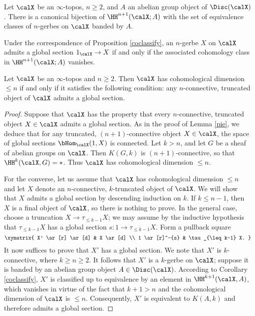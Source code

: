 \begin{corollary}\label{coclassify}
Let $\calX$ be an $\infty$-topos, $n \geq 2$, and $A$ an abelian group object
of $\Disc( \calX)$. There is a canonical bijection of
$\HH^{n+1}(\calX; A)$ with the set of equivalence classes of $n$-gerbes on $\calX$ banded by $A$.
\end{corollary}

\begin{remark}
Under the correspondence of Proposition \ref{coclassify}, an $n$-gerbe $X$ on $\calX$
admits a global section $1_{\calX} \rightarrow X$ if and only if the associated cohomology
class in $\HH^{n+1}(\calX;A)$ vanishes.
\end{remark}

\begin{theorem}\label{cohdim}
Let $\calX$ be an $\infty$-topos and $n \geq 2$. Then $\calX$ has
cohomological dimension $\leq n$ if and only if it satisfies the
following condition: any $n$-connective, truncated object of
$\calX$ admits a global section.
\end{theorem}

\begin{proof}
Suppose that $\calX$ has the property that every
$n$-connective, truncated object $X \in \calX$ admits a global
section. As in the proof of Lemma \ref{pie}, we deduce that for any
truncated, $(n+1)$-connective object $X \in \calX$, the space of global sections 
$\bHom_{\calX}(1,X)$ is connected.
Let $k > n$, and let $G$ be a sheaf of abelian groups on $\calX$. Then $K(G,k)$ is
$(n+1)$-connective, so that $\HH^k(\calX,G) = \ast$. Thus $\calX$ has
cohomological dimension $\leq n$.

For the converse, let us assume that $\calX$ has cohomological
dimension $\leq n$ and let $X$ denote an $n$-connective,
$k$-truncated object of $\calX$. We will show that $X$ admits a
global section by descending induction on $k$. If $k \leq n-1$, then $X$ is a final
object of $\calX$, so there is nothing to prove. In the general case, choose a truncation
$X \rightarrow \tau_{\leq k-1} X$; we may assume
by the inductive hypothesis that $\tau_{\leq k-1} X$ has a global section $s: 1
\rightarrow \tau_{\leq k-1} X$.
Form a pullback square
$$ \xymatrix{ X' \ar[r] \ar[d] & X \ar[d] \\
1 \ar[r]^-{s} & \tau_{\leq k-1} X. }$$ 
It now suffices to prove that $X'$ has a global section. We note that $X'$ is $k$-connective, where $k \geq n \geq 2$. It follows that $X'$ is a $k$-gerbe on $\calX$; suppose it is banded by
an abelian group object $A \in \Disc(\calX)$. 
According to Corollary \ref{coclassify}, $X'$ is classified up to equivalence by an element in $\HH^{k+1}(\calX, A)$, which vanishes in virtue of the fact that
$k+1 > n$ and the cohomological dimension of $\calX$ is $\leq n$. Consequently, $X'$ is equivalent to $K(A,k)$ and therefore admits a global section.
\end{proof}

